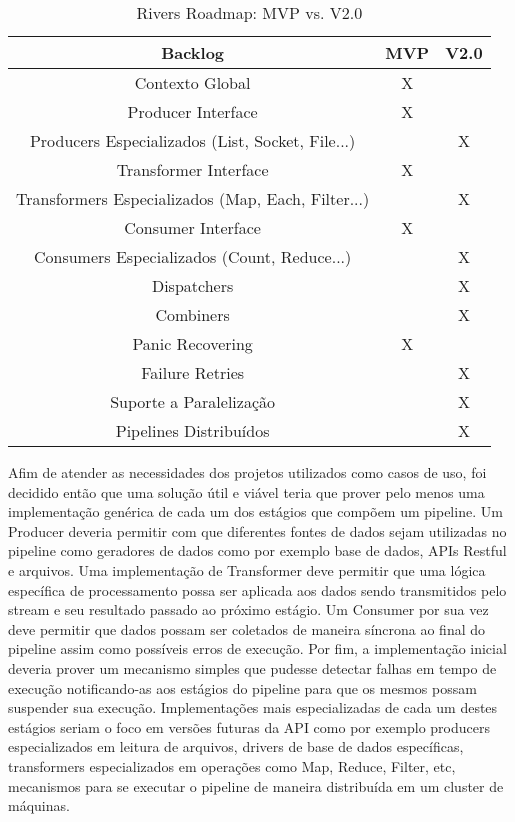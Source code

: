 \begin{table}[h!]
    \centering
    \begin{tabular}{||c c c||} 
        \hline
        Backlog & MVP & V2.0 \\ [0.5ex] 
        \hline\hline
        Contexto Global & X & \\ 
        \hline
        Producer Interface & X & \\ 
        \hline
        Producers Especializados (List, Socket, File...) & & X \\ 
        \hline
        Transformer Interface & X & \\ 
        \hline
        Transformers Especializados (Map, Each, Filter...) & & X \\ 
        \hline
        Consumer Interface & X & \\
        \hline
        Consumers Especializados (Count, Reduce...) & & X \\
        \hline
        Dispatchers & & X \\
        \hline
        Combiners & & X \\
        \hline
        Panic Recovering & X & \\
        \hline
        Failure Retries & & X \\
        \hline
        Suporte a Paralelização & & X \\
        \hline
        Pipelines Distribuídos & & X \\ [1ex]
        \hline
    \end{tabular}
    \caption{Rivers Roadmap: MVP vs. V2.0}
    \label{mvp:requirements}
\end{table}

Afim de atender as necessidades dos projetos utilizados como casos de uso, foi decidido então que uma solução útil e viável teria que prover pelo menos uma implementação genérica de cada um dos estágios que compõem um pipeline. Um Producer deveria permitir com que diferentes fontes de dados sejam utilizadas no pipeline como geradores de dados como por exemplo base de dados, APIs Restful e arquivos. Uma implementação de Transformer deve permitir que uma lógica específica de processamento possa ser aplicada aos dados sendo transmitidos pelo stream e seu resultado passado ao próximo estágio. Um Consumer por sua vez deve permitir que dados possam ser coletados de maneira síncrona ao final do pipeline assim como possíveis erros de execução. Por fim, a implementação inicial deveria prover um mecanismo simples que pudesse detectar falhas em tempo de execução notificando-as aos estágios do pipeline para que os mesmos possam suspender sua execução.  Implementações mais especializadas de cada um destes estágios seriam o foco em versões futuras da API como por exemplo producers especializados em leitura de arquivos, drivers de base de dados específicas, transformers especializados em operações como Map, Reduce, Filter, etc, mecanismos para se executar o pipeline de maneira distribuída em um cluster de máquinas.

